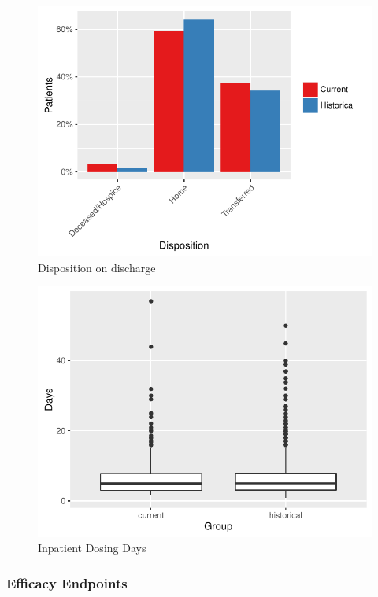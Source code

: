 \documentclass[]{article}
\begin{document}
\begin{figure}[H]
\centering
\includegraphics{warfarin_analysis_ASHP_files/figure-latex/disposition_hist-1.pdf}
\caption{Disposition on discharge}
\end{figure}

\begin{figure}[H]
\centering
\includegraphics{warfarin_analysis_ASHP_files/figure-latex/dosing_days_hist-1.pdf}
\caption{Inpatient Dosing Days}
\end{figure}

\subsubsection{Efficacy Endpoints}\label{efficacy-endpoints-1}
\end{document}

